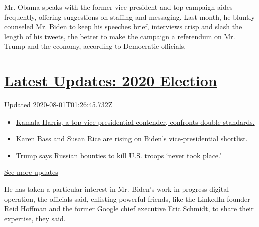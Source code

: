 Mr. Obama speaks with the former vice president and top campaign aides
frequently, offering suggestions on staffing and messaging. Last month,
he bluntly counseled Mr. Biden to keep his speeches brief, interviews
crisp and slash the length of his tweets, the better to make the
campaign a referendum on Mr. Trump and the economy, according to
Democratic officials.

\hypertarget{latest-updates-2020-election}{%
\section{\texorpdfstring{\href{https://www.nytimes.com/2020/07/31/us/elections/biden-vs-trump.html?action=click\&pgtype=Article\&state=default\&region=MAIN_CONTENT_1\&context=storylines_live_updates}{Latest
Updates: 2020
Election}}{Latest Updates: 2020 Election}}\label{latest-updates-2020-election}}

Updated 2020-08-01T01:26:45.732Z

\begin{itemize}
\tightlist
\item
  \href{https://www.nytimes.com/2020/07/31/us/elections/biden-vs-trump.html?action=click\&pgtype=Article\&state=default\&region=MAIN_CONTENT_1\&context=storylines_live_updates\#link-29fdff45}{Kamala
  Harris, a top vice-presidential contender, confronts double
  standards.}
\item
  \href{https://www.nytimes.com/2020/07/31/us/elections/biden-vs-trump.html?action=click\&pgtype=Article\&state=default\&region=MAIN_CONTENT_1\&context=storylines_live_updates\#link-13ec3d9c}{Karen
  Bass and Susan Rice are rising on Biden's vice-presidential
  shortlist.}
\item
  \href{https://www.nytimes.com/2020/07/31/us/elections/biden-vs-trump.html?action=click\&pgtype=Article\&state=default\&region=MAIN_CONTENT_1\&context=storylines_live_updates\#link-49e9a016}{Trump
  says Russian bounties to kill U.S. troops `never took place.'}
\end{itemize}

\href{https://www.nytimes.com/2020/07/31/us/elections/biden-vs-trump.html?action=click\&pgtype=Article\&state=default\&region=MAIN_CONTENT_1\&context=storylines_live_updates}{See
more updates}

He has taken a particular interest in Mr. Biden's work-in-progress
digital operation, the officials said, enlisting powerful friends, like
the LinkedIn founder Reid Hoffman and the former Google chief executive
Eric Schmidt, to share their expertise, they said.

